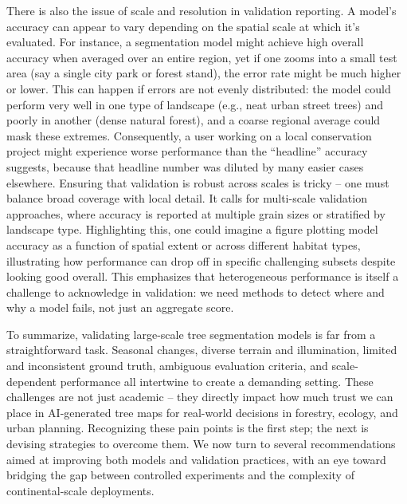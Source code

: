 \documentclass[runningheads]{llncs}
\begin{document}
There is also the issue of scale and resolution in validation reporting.
A model's accuracy can appear to vary depending on the spatial scale at
which it's evaluated. For instance, a segmentation model might achieve
high overall accuracy when averaged over an entire region, yet if one
zooms into a small test area (say a single city park or forest stand),
the error rate might be much higher or lower. This can happen if errors
are not evenly distributed: the model could perform very well in one
type of landscape (e.g., neat urban street trees) and poorly in another
(dense natural forest), and a coarse regional average could mask these
extremes. Consequently, a user working on a local conservation project
might experience worse performance than the ``headline'' accuracy
suggests, because that headline number was diluted by many easier cases
elsewhere. Ensuring that validation is robust across scales is tricky --
one must balance broad coverage with local detail. It calls for
multi-scale validation approaches, where accuracy is reported at
multiple grain sizes or stratified by landscape type. Highlighting this,
one could imagine a figure plotting model accuracy as a function of
spatial extent or across different habitat types, illustrating how
performance can drop off in specific challenging subsets despite looking
good overall. This emphasizes that heterogeneous performance is itself a
challenge to acknowledge in validation: we need methods to detect where
and why a model fails, not just an aggregate score.

To summarize, validating large-scale tree segmentation models is far
from a straightforward task. Seasonal changes, diverse terrain and
illumination, limited and inconsistent ground truth, ambiguous
evaluation criteria, and scale-dependent performance all intertwine to
create a demanding setting. These challenges are not just academic --
they directly impact how much trust we can place in AI-generated tree
maps for real-world decisions in forestry, ecology, and urban planning.
Recognizing these pain points is the first step; the next is devising
strategies to overcome them. We now turn to several recommendations
aimed at improving both models and validation practices, with an eye
toward bridging the gap between controlled experiments and the
complexity of continental-scale deployments.
\end{document}
